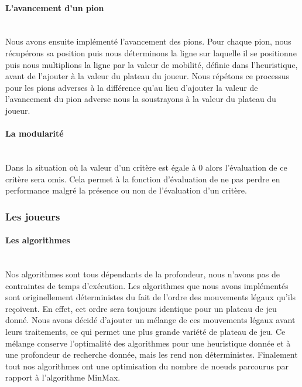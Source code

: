 \documentclass{article}
\begin{document}
\paragraph{L'avancement d'un pion}
~~\\
\newline
Nous avons ensuite implémenté l'avancement des pions. Pour chaque pion, nous récupérons sa position puis nous déterminons la ligne sur laquelle il se positionne puis nous multiplions la ligne par la valeur de mobilité, définie dans l'heuristique, avant de l'ajouter à la valeur du plateau du joueur. Nous répétons ce processus pour les pions adverses à la différence qu'au lieu d'ajouter la valeur de l'avancement du pion adverse nous la soustrayons à la valeur du plateau du joueur. 
\paragraph{La modularité}
~~\\
\newline
Dans la situation où la valeur d'un critère est égale à 0 alors l'évaluation de ce critère sera omis.
Cela permet à la fonction d'évaluation de ne pas perdre en performance malgré la présence ou non de l'évaluation d'un critère. 

\subsubsection{Les joueurs}\label{player_architecture}

\paragraph{Les algorithmes}
~~\\
\newline
Nos algorithmes sont tous dépendants de la profondeur, nous n'avons pas de contraintes de temps d'exécution. \newline
Les algorithmes que nous avons implémentés sont originellement déterministes du fait de l'ordre des mouvements légaux qu'ils reçoivent. En effet, cet ordre sera toujours identique pour un plateau de jeu donné. 
Nous avons décidé d'ajouter un mélange de ces mouvements légaux avant leurs traitements, ce qui permet une plus grande variété de plateau de jeu. Ce mélange conserve l'optimalité des algorithmes pour une heuristique donnée et à une profondeur de recherche donnée, mais les rend non déterministes.
Finalement tout nos algorithmes ont une optimisation du nombre de noeuds parcourus par rapport à l'algorithme MinMax.
\end{document}
